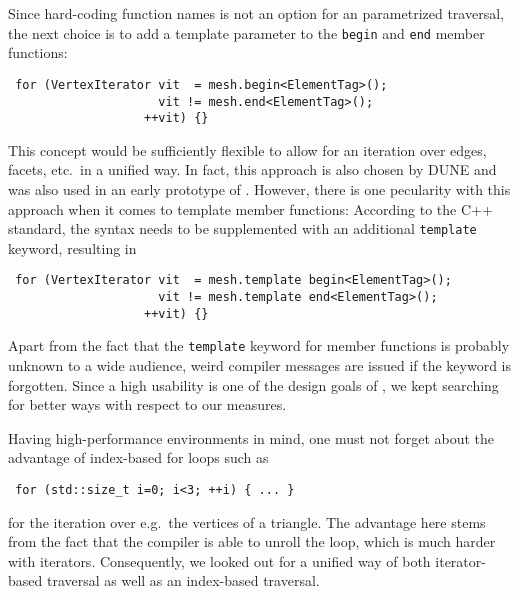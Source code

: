  Since hard-coding function names is not an option for an parametrized traversal,
 the next choice is to add a template parameter to the \lstinline|begin| and \lstinline|end| member functions:
 \begin{lstlisting}
 for (VertexIterator vit  = mesh.begin<ElementTag>();
                     vit != mesh.end<ElementTag>();
                   ++vit) {}
 \end{lstlisting}
 This concept would be sufficiently flexible to allow for an iteration over edges, facets, etc.~in a unified way.
 In fact, this approach is also chosen by DUNE \cite{DUNE} and was also used in an early prototype of {\ViennaGrid}.
 However, there is one pecularity with this approach when it comes to template member functions: According to the C++ standard, the syntax needs to be supplemented with an additional \lstinline|template| keyword, resulting in
 \begin{lstlisting}
 for (VertexIterator vit  = mesh.template begin<ElementTag>();
                     vit != mesh.template end<ElementTag>();
                   ++vit) {}
 \end{lstlisting}
 Apart from the fact that the \lstinline|template| keyword for member functions is probably unknown to a wide audience,
 weird compiler messages are issued if the keyword is forgotten. Since a high usability is one of the design goals of {\ViennaGrid},
 we kept searching for better ways with respect to our measures.

 Having high-performance environments in mind, one must not forget about the advantage of index-based for loops such as
 \begin{lstlisting}
 for (std::size_t i=0; i<3; ++i) { ... }
 \end{lstlisting}
 for the iteration over e.g.~the vertices of a triangle.
 The advantage here stems from the fact that the compiler is able to unroll the loop, which is much harder with iterators.
 Consequently, we looked out for a unified way of both iterator-based traversal as well as an index-based traversal.

